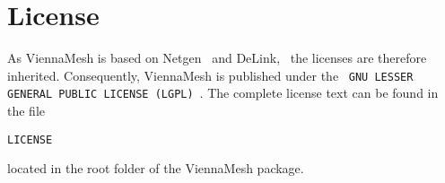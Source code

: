 
\section{License} %

As ViennaMesh is based on Netgen~\cite{netgen} and DeLink,~\cite{delink} the licenses are therefore 
inherited. Consequently, ViennaMesh is published under the 
~\texttt{GNU LESSER GENERAL PUBLIC LICENSE (LGPL)}~\cite{lgpl}. The complete license text can be found 
in the file 

\begin{exaipd}
\begin{Verbatim}
LICENSE
\end{Verbatim}
\end{exaipd}

located in the root folder of the ViennaMesh package.




